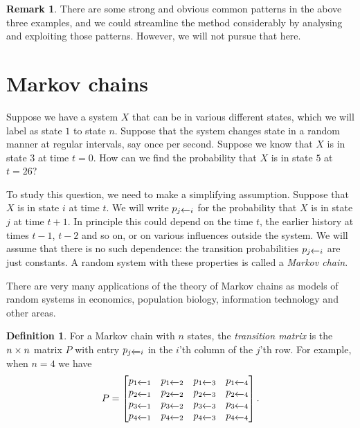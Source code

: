 \documentclass[reqno]{amsart}
\theoremstyle{definition}
\newtheorem{remark}[theorem]{Remark}
\newtheorem{definition}[theorem]{Definition}
\newcommand{\dfn}[1]{\emph{{#1}}\index{#1}}
\begin{document}
\begin{remark}
 There are some strong and obvious common patterns in the above three
 examples, and we could streamline the method considerably by
 analysing and exploiting those patterns.  However, we will not pursue
 that here.
\end{remark}

\section{Markov chains}

Suppose we have a system $X$ that can be in various different states,
which we will label as state $1$ to state $n$.  Suppose that the
system changes state in a random manner at regular intervals, say once
per second.  Suppose we know that $X$ is in state $3$ at time $t=0$.
How can we find the probability that $X$ is in state $5$ at $t=26$?

To study this question, we need to make a simplifying assumption.
Suppose that $X$ is in state $i$ at time $t$.  We will write
$p_{j\xleftarrow{}i}$ for the probability that $X$ is in state $j$ at time
$t+1$.  In principle this could depend on the time $t$, the earlier
history at times $t-1$, $t-2$ and so on, or on various influences
outside the system.  We will assume that there is no such dependence:
the transition probabilities $p_{j\xleftarrow{}i}$ are just constants.  A
random system with these properties is called a \dfn{Markov chain}.

There are very many applications of the theory of Markov chains as
models of random systems in economics, population biology, information
technology and other areas.

\begin{definition}\label{defn-transition-matrix}
 For a Markov chain with $n$ states, the \dfn{transition matrix} is
 the $n\times n$ matrix $P$ with entry $p_{j\xleftarrow{}i}$ in the $i$'th
 column of the $j$'th row.  For example, when $n=4$ we have
 \[ P = \left[\begin{matrix}
     p_{1\xleftarrow{}1} & p_{1\xleftarrow{}2} & p_{1\xleftarrow{}3} & p_{1\xleftarrow{}4} \\
     p_{2\xleftarrow{}1} & p_{2\xleftarrow{}2} & p_{2\xleftarrow{}3} & p_{2\xleftarrow{}4} \\
     p_{3\xleftarrow{}1} & p_{3\xleftarrow{}2} & p_{3\xleftarrow{}3} & p_{3\xleftarrow{}4} \\
     p_{4\xleftarrow{}1} & p_{4\xleftarrow{}2} & p_{4\xleftarrow{}3} & p_{4\xleftarrow{}4}
    \end{matrix}\right].
 \]
\end{definition}
\end{document}
